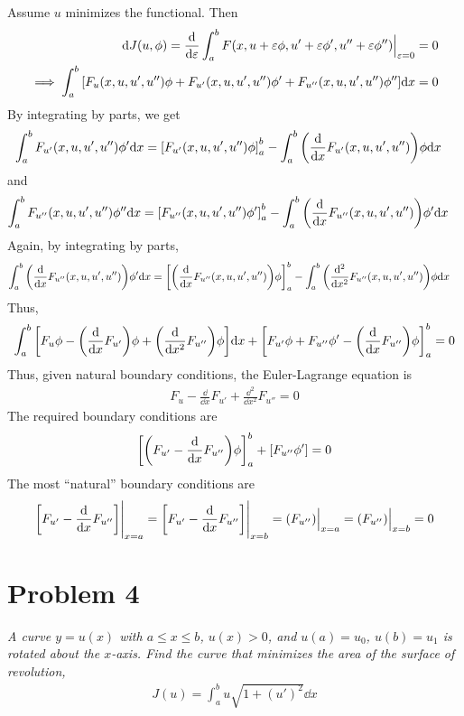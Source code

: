 \documentclass[12pt]{article}
\theoremstyle{plain}
\begin{document}
Assume $u$ minimizes the functional.  Then
\begin{align*}
    \dd J(u, \phi) = \frac{\dd}{\dd \varepsilon} \int_a^b F(x, u + \varepsilon \phi, u' + \varepsilon \phi', u'' + \varepsilon \phi'')\Big|_{\varepsilon = 0} &= 0 \\
    \implies \int_a^b \qty[F_u(x, u, u', u'')\phi + F_{u'}(x, u, u', u'')\phi' + F_{u''}(x, u, u', u'')\phi''] \dd x &= 0
\end{align*}
By integrating by parts, we get
\begin{align*}
    \int_a^b F_{u'}(x, u, u', u'')\phi' \dd x &= \qty[F_{u'}(x, u, u', u'')\phi]_a^b - \int_a^b \qty(\frac{\dd}{\dd x}F_{u'}(x, u, u', u''))\phi \dd x
\end{align*}
and
\begin{align*}
    \int_a^b F_{u''}(x, u, u', u'')\phi'' \dd x &= \qty[F_{u''}(x, u, u', u'')\phi']_a^b - \int_a^b \qty(\frac{\dd}{\dd x}F_{u''}(x, u, u', u''))\phi' \dd x
\end{align*}
Again, by integrating by parts,
\begin{align*}
    \int_a^b \qty(\frac{\dd}{\dd x}F_{u''}(x, u, u', u''))\phi' \dd x &= \qty[\qty(\frac{\dd}{\dd x}F_{u''}(x, u, u', u''))\phi]_a^b - \int_a^b \qty(\frac{\dd^2}{\dd x^2}F_{u''}(x, u, u', u''))\phi \dd x
\end{align*}
Thus,
\begin{align*}
    \int_a^b \qty[F_u \phi - \qty(\frac{\dd}{\dd x}F_{u'})\phi + \qty(\frac{\dd}{\dd x^2}F_{u''})\phi]\dd x + \qty[F_{u'}\phi + F_{u''}\phi' - \qty(\frac{\dd}{\dd x}F_{u''})\phi]_a^b = 0
\end{align*}
Thus, given natural boundary conditions, the Euler-Lagrange equation is
\begin{align*}
    F_u - \frac{\dd}{\dd x}F_{u'} + \frac{\dd^2}{\dd x^2}F_{u''} = 0
\end{align*}
The required boundary conditions are
\begin{align*}
    \qty[\qty(F_{u'} - \frac{\dd}{\dd x}F_{u''})\phi]_a^b + \qty[F_{u''}\phi'] = 0
\end{align*}
The most ``natural'' boundary conditions are
\begin{align*}
    \qty[F_{u'} - \frac{\dd}{\dd x}F_{u''}]\Bigg|_{x = a} = \qty[F_{u'} - \frac{\dd}{\dd x}F_{u''}]\Bigg|_{x = b} = \qty(F_{u''})\Big|_{x = a} = \qty(F_{u''})\Big|_{x = b} = 0
\end{align*}

\section*{Problem 4}
\textit{A curve $y = u(x)$ with $a \leq x \leq b$, $u(x) > 0$, and $u(a) = u_0$, $u(b) = u_1$ is rotated about the $x$-axis.  Find the curve that minimizes the area of the surface of revolution,}
\begin{align*}
    J(u) = \int_a^b u \sqrt{1 + (u')^2}\dd x
\end{align*} \\
\end{document}
